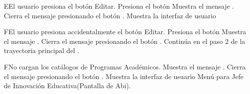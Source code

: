 \begin{UCtrayectoriaA}{E}{El usuario presiona el botón Editar.}
	\UCpaso[\UCactor] Presiona el botón 
    \UCpaso Muestra el mensaje .
    \UCpaso[\UCactor] Cierra el mensaje presionando el botón .
\UCpaso Muestra la interfaz de usuario 
\end{UCtrayectoriaA}


\begin{UCtrayectoriaA}{F}{El usuario presiona accidentalmente el botón Editar.}
	\UCpaso[\UCactor] Presiona el botón 
    \UCpaso Muestra el mensaje .
    \UCpaso[\UCactor] Cierra el mensaje presionando el botón .
    \UCpaso Continúa en el paso 2 de la trayectoria principal del .
\end{UCtrayectoriaA}

\begin{UCtrayectoriaA}{F}{No cargan los catálogos de Programas Académicos.}
    \UCpaso Muestra el mensaje .
    \UCpaso[\UCactor] Cierra el mensaje presionando el botón .
\UCpaso Muestra la interfaz de usuario Menú para Jefe de Innovación Educativa(Pantalla de Abi).
\end{UCtrayectoriaA}


